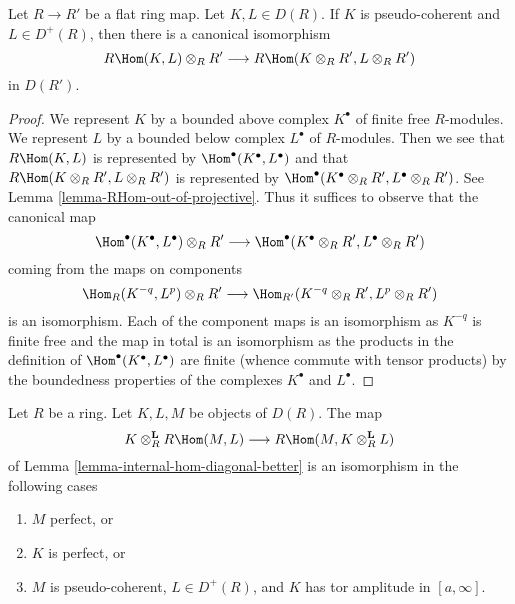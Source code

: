 \begin{lemma}
\label{lemma-base-change-RHom}
Let $R \to R'$ be a flat ring map. Let $K, L \in D(R)$.
If $K$ is pseudo-coherent and $L \in D^{+}(R)$, then
there is a canonical isomorphism
$$
R\Hom(K, L) \otimes_R R'
\longrightarrow
R\Hom(K \otimes_R R', L \otimes_R R')
$$
in $D(R')$.
\end{lemma}

\begin{proof}
We represent $K$ by a bounded above complex $K^\bullet$ of finite
free $R$-modules. We represent $L$ by a bounded below complex $L^\bullet$
of $R$-modules. Then we see that
$R\Hom(K, L)$ is represented by $\Hom^\bullet(K^\bullet, L^\bullet)$
and that
$R\Hom(K \otimes_R R', L \otimes_R R')$
is represented by
$\Hom^\bullet(K^\bullet \otimes_R R', L^\bullet \otimes_R R')$.
See Lemma \ref{lemma-RHom-out-of-projective}.
Thus it suffices to observe that the canonical map
$$
\Hom^\bullet(K^\bullet, L^\bullet) \otimes_R R'
\longrightarrow
\Hom^\bullet(K^\bullet \otimes_R R', L^\bullet \otimes_R R')
$$
coming from the maps on components
$$
\Hom_R(K^{-q}, L^p) \otimes_R R'
\longrightarrow
\Hom_{R'}(K^{-q} \otimes_R R', L^p \otimes_R R')
$$
is an isomorphism. Each of the component maps is an isomorphism
as $K^{-q}$ is finite free and the map in total is an isomorphism
as the products in the definition of $\Hom^\bullet(K^\bullet, L^\bullet)$
are finite (whence commute with tensor products)
by the boundedness properties of the complexes $K^\bullet$
and $L^\bullet$.
\end{proof}

\begin{lemma}
\label{lemma-internal-hom-evaluate-tensor-isomorphism}
Let $R$ be a ring. Let $K, L, M$ be objects of $D(R)$. The map
$$
K \otimes_R^\mathbf{L} R\Hom(M, L) \longrightarrow
R\Hom(M, K \otimes_R^\mathbf{L} L)
$$
of Lemma \ref{lemma-internal-hom-diagonal-better}
is an isomorphism in the following cases
\begin{enumerate}
\item $M$ perfect, or
\item $K$ is perfect, or
\item $M$ is pseudo-coherent, $L \in D^+(R)$, and $K$ has
tor amplitude in $[a, \infty]$.
\end{enumerate}
\end{lemma}

